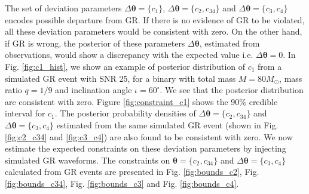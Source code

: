 \documentclass[prd,preprintnumbers,twocolumn,eqsecnum,floatfix,a4paper,nofootinbib,superscriptaddress]{revtex4}
\newcommand{\h}{\mathpzc{h}}
\newcommand{\hlm}{\mathpzc{h}_{\ell m}}
\newcommand{\Ylm}{{Y}^{-2}_{\ell m}}
\newcommand{\blambda}{\bm{\lambda}}
\newcommand{\btheta}{\bm{\theta}}
\begin{document}
% 
% 	

The set of deviation parameters $\Delta \btheta=\{c_1\}$, $\Delta \btheta=\{c_2, c_{34}\}$ and $\Delta \btheta=\{c_3, c_{4}\}$ encodes possible departure from  GR. If there is no evidence of GR to be violated, all these deviation parameters would be consistent with zero. On the other hand, if GR is wrong, the posterior of these parameters $\Delta \btheta$, estimated from observations, would show a discrepancy with the expected value i.e. $\Delta \btheta=0$. In Fig. \ref{fig:c1_hist}, we show an example of posterior distribution of $c_1$ from a simulated GR event with SNR 25, for a binary with total mass $M = 80M_{\odot}$, mass ratio $q=1/9$ and inclination angle $ {\iota}=60^{\circ} $.  We see that the posterior distribution are consistent with zero. Figure \ref{fig:constraint_c1} shows the 90\% credible interval for $c_1$.  The posterior probability densities of $\Delta \btheta=\{c_2, c_{34}\}$ and $\Delta \btheta=\{c_3, c_{4}\}$ estimated from the same simulated GR event (shown in Fig. \ref{fig:c2_c34} and \ref{fig:c3_c4}) are also found to be consistent with zero. We now estimate the expected constraints on these deviation parameters by injecting simulated GR waveforms. The constraints on $\btheta=\{c_2, c_{34}\}$ and $\Delta \btheta=\{c_3, c_{4}\}$ calculated from GR events are presented in Fig. \ref{fig:bounds_c2}, Fig. \ref{fig:bounds_c34}, Fig. \ref{fig:bounds_c3} and Fig. \ref{fig:bounds_c4}.
\end{document}
